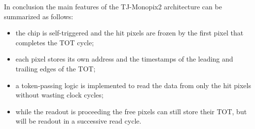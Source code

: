 In conclusion the main features of the TJ-Monopix2 architecture can be summarized as follows:

\begin{itemize}
\item the chip is self-triggered and the hit pixels are frozen by the first pixel that completes the TOT cycle;
\item each pixel stores its own address and the timestamps of the leading and trailing edges of the TOT;
\item a token-passing logic is implemented to read the data from only the hit pixels without wasting clock cycles;
\item while the readout is proceeding the free pixels can still store their TOT, but will be readout in a successive read cycle.
\end{itemize}


\begin{comment}
In~\autoref{fig:RO2} is displayed an example of the readout of two hits. 

\begin{figure}[h!]
\centering
\texttt{[image: RO2]}
\caption{Schematic of a readout sequence where two hits are being processed.}
\label{fig:RO2}
\end{figure}
\end{comment}
